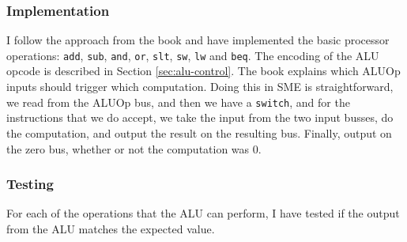 \subsubsection*{Implementation}
I follow the approach from the book %
and have implemented the basic processor operations: \texttt{add}, \texttt{sub},
\texttt{and}, \texttt{or}, \texttt{slt}, \texttt{sw}, \texttt{lw} and
\texttt{beq}. The encoding of the ALU opcode is described in Section
\ref{sec:alu-control}. The book explains which ALUOp inputs should trigger
which computation. Doing this in SME is straightforward, we read from the ALUOp
bus, and then we have a \texttt{switch}, and for the instructions that we do
accept, we take the input from the two input busses, do the computation, and
output the result on the resulting bus. Finally, output on the zero bus,
whether or not the computation was 0.

\subsubsection*{Testing}
For each of the operations that the ALU can perform, I have tested if the
output from the ALU matches the expected value.

